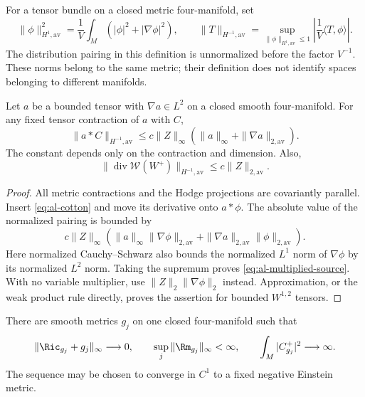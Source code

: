 For a tensor bundle on a closed metric four-manifold, set
\[
 \|\phi\|_{H^1,\mathrm{av}}^2
 =\frac1V\int_M(|\phi|^2+|\nabla\phi|^2),\qquad
 \|T\|_{H^{-1},\mathrm{av}}
 =\sup_{\|\phi\|_{H^1,\mathrm{av}}\le1}
 \left|\frac1V\langle T,\phi\rangle\right|.
\]
The distribution pairing in this definition is unnormalized before the
factor $V^{-1}$.  These norms belong to the same metric; their definition
does not identify spaces belonging to different manifolds.

\begin{lemma}
\label{lem:al-weak-source}
Let $a$ be a bounded tensor with $\nabla a\in L^2$ on a closed smooth
four-manifold.  For any fixed tensor contraction of $a$ with $C$,
\begin{equation}\label{eq:al-multiplied-source}
 \|a*C\|_{H^{-1},\mathrm{av}}
 \le c\|Z\|_\infty
 \left(\|a\|_\infty+\|\nabla a\|_{2,\mathrm{av}}\right).
\end{equation}
The constant depends only on the contraction and dimension.  Also,
\begin{equation}\label{eq:al-unmultiplied-source}
 \|\operatorname{div}\mathcal W(W^+)\|_{H^{-1},\mathrm{av}}
 \le c\|Z\|_{2,\mathrm{av}}.
\end{equation}
\end{lemma}

\begin{proof}
All metric contractions and the Hodge projections are covariantly
parallel.  Insert \eqref{eq:al-cotton} and move its derivative onto
$a*\phi$.  The absolute value of the normalized pairing is bounded by
\[
 c\|Z\|_\infty\left(
 \|a\|_\infty\|\nabla\phi\|_{2,\mathrm{av}}
 +\|\nabla a\|_{2,\mathrm{av}}\|\phi\|_{2,\mathrm{av}}\right).
\]
Here normalized Cauchy--Schwarz also bounds the normalized $L^1$ norm
of $\nabla\phi$ by its normalized $L^2$ norm.  Taking the supremum proves
\eqref{eq:al-multiplied-source}.  With no variable multiplier, use
$\|Z\|_2\|\nabla\phi\|_2$ instead.  Approximation, or the weak product
rule directly, proves the assertion for bounded $W^{1,2}$ tensors.
\end{proof}

\begin{proposition}
\label{prop:al-cotton-example}
There are smooth metrics $g_j$ on one closed four-manifold such that
\[
 \|\Ric_{g_j}+g_j\|_\infty\longrightarrow0,
 \qquad \sup_j\|\Rm_{g_j}\|_\infty<\infty,
 \qquad \int_M|C^+_{g_j}|^2\longrightarrow\infty.
\]
The sequence may be chosen to converge in $C^1$ to a fixed negative
Einstein metric.
\end{proposition}

